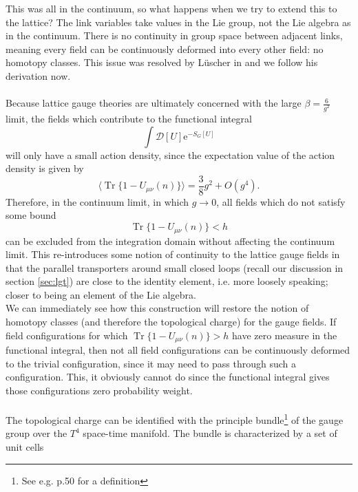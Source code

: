 \documentclass[a4paper,10pt]{book}
\begin{document}
This was all in the continuum, so what happens when we try to extend this to the lattice? The link variables take values in the Lie group, not the Lie algebra as in the continuum. There is no continuity in group space between adjacent links, meaning every field can be continuously deformed into every other field: no homotopy classes. This issue was resolved by Lüscher in \cite{L_scherM1982Tolg} and we follow his derivation now.\\\\Because lattice gauge theories are ultimately concerned with the large $\beta = \frac{6}{g^2}$ limit, the fields which contribute to the functional integral
\begin{equation*}
\int \mathcal{D}[U] \mathrm{e}^{-S_{G}[U]}
\end{equation*}
will only have a small action density, since the expectation value of the action density is given by
\begin{equation}\label{eq:actionDensityExpVal}
\langle\operatorname{Tr}\{1-U_{\mu \nu}(n)\}\rangle=\frac{3}{8} g^{2}+O\left(g^{4}\right).
\end{equation}
Therefore, in the continuum limit, in which $g\rightarrow 0$, all fields which do not satisfy some bound 
\begin{equation}\label{eq:SmoothnessBound_topCharge}
\operatorname{Tr}\{1-U_{\mu \nu}(n)\} < h
\end{equation}
can be excluded from the integration domain without affecting the continuum limit. This re-introduces some notion of continuity to the lattice gauge fields in that the parallel transporters around small closed loops (recall our discussion in section \ref{sec:lgt}) are close to the identity element, i.e. more loosely speaking; closer to being an element of the Lie algebra.\\We can immediately see how this construction will restore the notion of homotopy classes (and therefore the topological charge) for the gauge fields. If field configurations  for which $\operatorname{Tr}\{1-U_{\mu \nu}(n)\} > h$ have zero measure in the functional integral, then not all field configurations can be continuously deformed to the trivial configuration, since it may need to pass through such a configuration. This, it obviously cannot do since the functional integral gives those configurations zero probability weight.\\\\The topological charge can be identified with the principle bundle\footnote{See e.g. \cite{diffGeom} p.50 for a definition} of the gauge group over the $T^4$  space-time manifold. The bundle is characterized by a set of unit cells 
\end{document}
